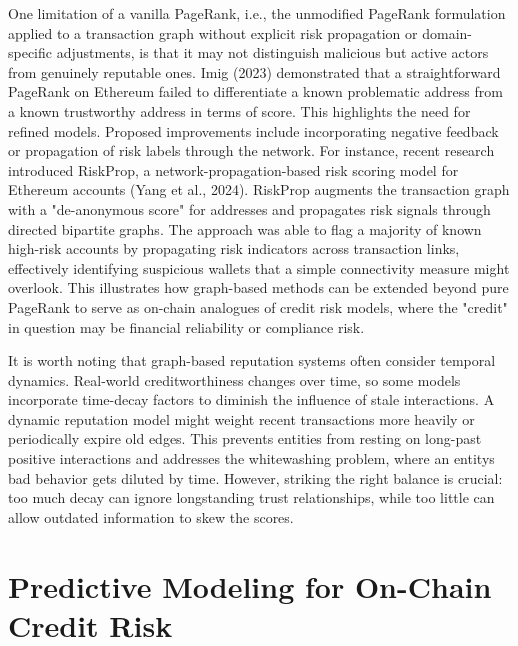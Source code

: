 \documentclass[
]{article}
\begin{document}
One limitation of a vanilla PageRank, i.e., the unmodified PageRank formulation applied to a transaction graph without explicit risk propagation or domain-specific adjustments, is that it may not distinguish malicious but active actors from genuinely reputable ones. Imig (2023) demonstrated that a straightforward PageRank on Ethereum failed to differentiate a known problematic address from a known trustworthy address in terms of score. This highlights the need for refined models. Proposed improvements include incorporating negative feedback or propagation of risk labels through the network. For instance, recent research introduced RiskProp, a network-propagation-based risk scoring model for Ethereum accounts (Yang et al., 2024). RiskProp augments the transaction graph with a "de-anonymous score" for addresses and propagates risk signals through directed bipartite graphs. The approach was able to flag a majority of known high-risk accounts by propagating risk indicators across transaction links, effectively identifying suspicious wallets that a simple connectivity measure might overlook. This illustrates how graph-based methods can be extended beyond pure PageRank to serve as on-chain analogues of credit risk models, where the "credit" in question may be financial reliability or compliance risk.

It is worth noting that graph-based reputation systems often consider temporal dynamics. Real-world creditworthiness changes over time, so some models incorporate time-decay factors to diminish the influence of stale interactions. A dynamic reputation model might weight recent transactions more heavily or periodically expire old edges. This prevents entities from resting on long-past positive interactions and addresses the whitewashing problem, where an entity\textquotesingle s bad behavior gets diluted by time. However, striking the right balance is crucial: too much decay can ignore longstanding trust relationships, while too little can allow outdated information to skew the scores.

\section{Predictive Modeling for On-Chain Credit Risk}\label{predictive-modeling-for-on-chain-credit-risk}
\end{document}
